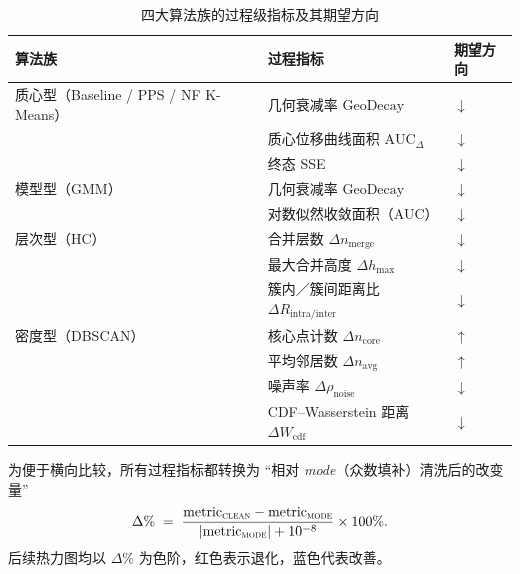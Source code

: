 \documentclass[10pt]{article} %
\numberwithin{equation}{section}
\begin{document}
\begin{enumerate}[label=\textbf{Step\,\arabic*.},itemindent=4em,leftmargin=0pt]
      \begin{table}[t]
  \centering\small
  \renewcommand{\arraystretch}{1.1}
  \setlength{\tabcolsep}{6pt}
  \begin{tabular}{@{}lll@{}}
  \toprule
  \textbf{算法族} & \textbf{过程指标} & \textbf{期望方向}\\
  \midrule
  质心型（Baseline / PPS / NF K-Means） 
    & 几何衰减率 \(\text{GeoDecay}\)                     & \(\downarrow\)\\
    & 质心位移曲线面积 \(\text{AUC}_{\Delta}\)           & \(\downarrow\)\\
    & 终态 SSE                                           & \(\downarrow\)\\[2pt]
  模型型（GMM） 
    & 几何衰减率 \(\text{GeoDecay}\)                     & \(\downarrow\)\\
    & 对数似然收敛面积（AUC）                            & \(\downarrow\)\\[2pt]
  层次型（HC） 
    & 合并层数 \(\Delta n_{\text{merge}}\)               & \(\downarrow\)\\
    & 最大合并高度 \(\Delta h_{\max}\)                   & \(\downarrow\)\\
    & \small 簇内／簇间距离比 \(\Delta R_{\text{intra/inter}}\) & \(\downarrow\)\\[2pt]
  密度型（DBSCAN） 
    & 核心点计数 \(\Delta n_{\text{core}}\)              & \(\uparrow\)\\
    & 平均邻居数 \(\Delta n_{\text{avg}}\)               & \(\uparrow\)\\
    & 噪声率 \(\Delta\rho_{\text{noise}}\)               & \(\downarrow\)\\
    & CDF–Wasserstein 距离 \(\Delta W_{\text{cdf}}\)     & \(\downarrow\)\\
  \bottomrule
  \end{tabular}
  \caption{四大算法族的过程级指标及其期望方向}
  \label{tab:proc_indicators}
\end{table}


      为便于横向比较，所有过程指标都转换为
      “相对 \textit{mode}（众数填补）清洗后的改变量”
      \begin{equation}
        \label{eq:delta_pct}
        \Delta\% \;=\;
        \frac{\text{metric}_{\textsc{clean}} - \text{metric}_{\textsc{mode}}}
             {\lvert\text{metric}_{\textsc{mode}}\rvert + 10^{-8}}\times100\% .
      \end{equation}
      后续热力图均以 \(\Delta\%\) 为色阶，红色表示退化，蓝色代表改善。


\end{enumerate}
\end{document}
